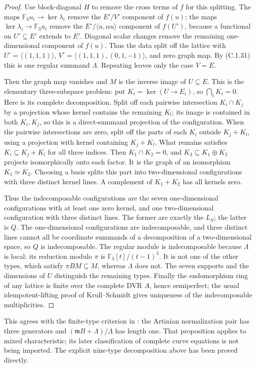 \begin{proof}
Use block-diagonal $H$ to remove the cross terms of $f$ for this
splitting. The maps $\mathbb F_3u_i\to\ker\lambda_i$ remove the
$E'/V'$ component of $f(u)$; the maps
$\ker\lambda_i\to\mathbb F_3u_i$ remove the
$E^{\circ}/\langle u,\alpha u\rangle$ component of $f(U')$,
because a functional on $U'\subseteq E'$ extends to $E'$.
Diagonal scalar changes remove the remaining one-dimensional
component of $f(u)$. Thus the data split off the lattice with
$U^{\circ}=\langle(1,1,1)\rangle$,
$V^{\circ}=\langle(1,1,1),(0,1,-1)\rangle$, and zero graph map.
By (C.1.31) this is one regular summand $\Lambda$.
Repeating leaves only the case $V=E$.

Then the graph map vanishes and $M$ is the inverse image of
$U\subseteq E$. This is the elementary three-subspace problem:
put $K_i=\ker(U\to E_i)$, so $\bigcap_iK_i=0$.
Here is its complete decomposition. Split off each pairwise
intersection $K_i\cap K_j$ by a projection whose kernel contains
the remaining $K_l$; its image is contained in both $K_i,K_j$,
so this is a direct-summand projection of the configuration.
When the pairwise intersections are zero, split off the parts
of each $K_i$ outside $K_j+K_l$, using a projection with kernel
containing $K_j+K_l$. What remains satisfies
$K_i\subseteq K_j+K_l$ for all three indices. Then
$K_1\cap K_2=0$, and $K_3\subseteq K_1\oplus K_2$ projects
isomorphically onto each factor. It is the graph of an
isomorphism $K_1\simeq K_2$. Choosing a basis splits this part
into two-dimensional configurations with three distinct kernel
lines. A complement of $K_1+K_2$ has all kernels zero.

Thus the indecomposable configurations are the seven
one-dimensional configurations with at least one zero kernel,
and one two-dimensional configuration with three distinct lines.
The former are exactly the $L_S$; the latter is $Q$.
The one-dimensional configurations are indecomposable, and three
distinct lines cannot all be coordinate summands of a decomposition
of a two-dimensional space, so $Q$ is indecomposable.
The regular module is indecomposable because $\Lambda$ is local:
its reduction modulo $\pi$ is
$\mathbb F_3[t]/(t-1)^3$. It is not one of the other types,
which satisfy $\pi BM\subseteq M$, whereas $\Lambda$ does not.
The seven supports and the dimensions of $U$ distinguish the
remaining types. Finally the endomorphism ring of any lattice
is finite over the complete DVR $A$, hence semiperfect; the usual
idempotent-lifting proof of Krull--Schmidt gives uniqueness of the
indecomposable multiplicities.
\end{proof}

This agrees with the finite-type criterion in
\cite[Proposition~1.2, printed p.~340]{C-Wiegand1991}:
the Artinian normalization pair has three generators and
$(\mathfrak mB+\Lambda)/\Lambda$ has length one.
That proposition applies to mixed characteristic; its later
classification of complete curve equations is not being imported.
The explicit nine-type decomposition above has been proved directly.
